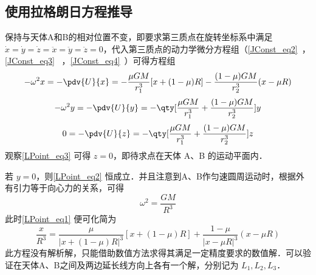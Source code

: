 

\subsection{使用拉格朗日方程推导}

保持与天体A和B的相对位置不变，即要求第三质点在旋转坐标系中满足 $\dot{x}=\dot{y}=\dot{z}=\ddot{x}=\ddot{y}=\ddot{z}=0$，代入第三质点的动力学微分方程组（\autoref{JConst_eq2}~，\autoref{JConst_eq3}~ ，\autoref{JConst_eq4}~）可得方程组
\begin{equation}\label{LPoint_eq1}
-\omega^2 x =- \pdv{U}{x}=-\frac{\mu GM}{r_1^3}[x+(1-\mu)R]-\frac{(1-\mu)GM}{r_2^3}(x-\mu R)
\end{equation}
\begin{equation}\label{LPoint_eq2}
-\omega^2 y =- \pdv{U}{y}=-\qty[\frac{\mu GM}{r_1^3}+\frac{(1-\mu)GM}{r_2^3}]y
\end{equation}
\begin{equation}\label{LPoint_eq3}
0 =- \pdv{U}{z} =-\qty[\frac{\mu GM}{r_1^3}+\frac{(1-\mu)GM}{r_2^3}]z
\end{equation}
观察\autoref{LPoint_eq3} 可得 $z=0$，即待求点在天体 A、B 的运动平面内．

若 $y=0$，则\autoref{LPoint_eq2} 恒成立．并且注意到A、B作匀速圆周运动时，根据外有引力等于向心力的关系，可得
\begin{equation}%
\omega^2 =\frac{GM}{R^3}
\end{equation}
此时\autoref{LPoint_eq1} 便可化简为
\begin{equation}%
\frac{x}{R^3} =\frac{\mu}{|x+(1-\mu)R|^3}[x+(1-\mu)R]+\frac{1-\mu}{|x-\mu R|^3}(x-\mu R)
\end{equation}
此方程没有解析解，只能借助数值方法求得其满足一定精度要求的数值解．可以验证在天体A、B之间及两边延长线方向上各有一个解，分别记为 $L_1,L_2,L_3$．

